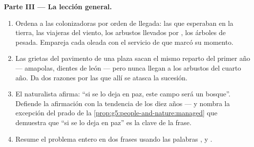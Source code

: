 \begin{problem}
\medskip\noindent\textbf{Parte III --- La lección general.}
\begin{enumerate}[resume]
  \item Ordena a las colonizadoras por orden de llegada: las 
        que esperaban en la tierra, las viajeras del viento, los
        arbustos llevados por , los árboles de  pesada.
        Empareja cada oleada con el servicio de  que marcó su
        momento.
  \item Las grietas del pavimento de una plaza sacan el mismo reparto
        del primer año --- amapolas, dientes de león --- pero nunca
        llegan a los arbustos del cuarto año. Da dos razones por las que
        allí se atasca la sucesión.
  \item El naturalista afirma: ``si se lo deja en paz, este campo será
        un bosque''. Defiende la afirmación con la tendencia de los diez
        años --- y nombra la excepción del prado de la
        \cref{prop:g5:people-and-nature:managed} que demuestra que ``si
        se lo deja en paz'' es la clave de la frase.
  \item Resume el problema entero en dos frases usando las palabras
        \emph{}, \emph{} y \emph{}.
\end{enumerate}
\end{problem}
